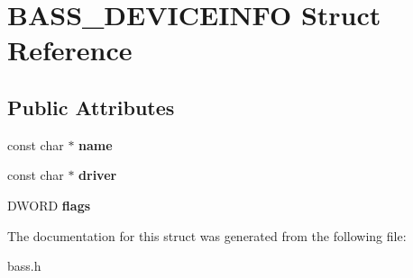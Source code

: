 \section{B\+A\+S\+S\+\_\+\+D\+E\+V\+I\+C\+E\+I\+N\+F\+O Struct Reference}
\label{struct_b_a_s_s___d_e_v_i_c_e_i_n_f_o}
\subsection*{Public Attributes}
\begin{DoxyCompactItemize}
\item 
const char $\ast$ {\bfseries name}\label{struct_b_a_s_s___d_e_v_i_c_e_i_n_f_o_a4f40b670573299964ecd8222076436eb}

\item 
const char $\ast$ {\bfseries driver}\label{struct_b_a_s_s___d_e_v_i_c_e_i_n_f_o_aa4a4e2d3eee9548b7f68440b8508ea11}

\item 
D\+W\+O\+R\+D {\bfseries flags}\label{struct_b_a_s_s___d_e_v_i_c_e_i_n_f_o_ae5d2db8d3570744a4b24e41dfa62554b}

\end{DoxyCompactItemize}


The documentation for this struct was generated from the following file\+:\begin{DoxyCompactItemize}
\item 
bass.\+h\end{DoxyCompactItemize}
